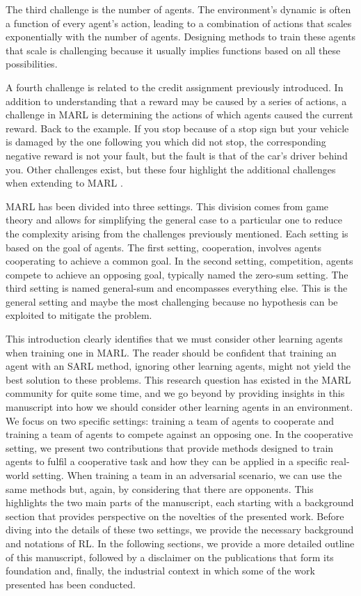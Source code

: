 The third challenge is the number of agents.
The environment's dynamic is often a function of every agent's action, leading to a combination of actions that scales exponentially with the number of agents.
Designing methods to train these agents that scale is challenging because it usually implies functions based on all these possibilities.

A fourth challenge is related to the credit assignment previously introduced.
In addition to understanding that a reward may be caused by a series of actions, a challenge in MARL is determining the actions of which agents caused the current reward.
Back to the example.
If you stop because of a stop sign but your vehicle is damaged by the one following you which did not stop, the corresponding negative reward is not your fault, but the fault is that of the car's driver behind you.
Other challenges exist, but these four highlight the additional challenges when extending to MARL \citep{marl-book}.

MARL has been divided into three settings.
This division comes from game theory and allows for simplifying the general case to a particular one to reduce the complexity arising from the challenges previously mentioned.
Each setting is based on the goal of agents.
The first setting, cooperation, involves agents cooperating to achieve a common goal.
In the second setting, competition, agents compete to achieve an opposing goal, typically named the zero-sum setting.
The third setting is named general-sum and encompasses everything else.
This is the general setting and maybe the most challenging because no hypothesis can be exploited to mitigate the problem.

This introduction clearly identifies that we must consider other learning agents when training one in MARL.
The reader should be confident that training an agent with an SARL method, ignoring other learning agents, might not yield the best solution to these problems.
This research question has existed in the MARL community for quite some time, and we go beyond by providing insights in this manuscript into how we should consider other learning agents in an environment.
We focus on two specific settings: training a team of agents to cooperate and training a team of agents to compete against an opposing one.
In the cooperative setting, we present two contributions that provide methods designed to train agents to fulfil a cooperative task and how they can be applied in a specific real-world setting.
When training a team in an adversarial scenario, we can use the same methods but, again, by considering that there are opponents.
This highlights the two main parts of the manuscript, each starting with a background section that provides perspective on the novelties of the presented work.
Before diving into the details of these two settings, we provide the necessary background and notations of RL.
In the following sections, we provide a more detailed outline of this manuscript, followed by a disclaimer on the publications that form its foundation and, finally, the industrial context in which some of the work presented has been conducted.


